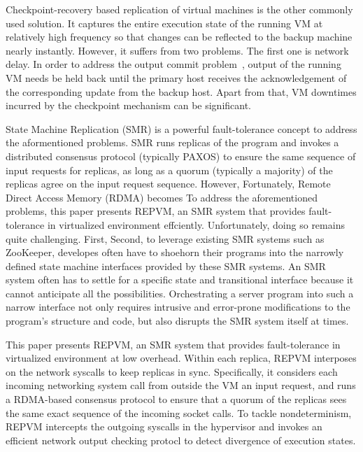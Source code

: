 Checkpoint-recovery based replication of virtual machines is the other commonly used solution. 
It captures the entire execution state of the running VM at relatively high frequency so that 
changes can be reflected to the backup machine nearly instantly. However, it suffers from two 
problems. The first one is network delay. In order to address the output commit 
problem~\cite{strom1987volatile}, output of the running VM needs be held back until the primary 
host receives the acknowledgement of the corresponding update from the backup host. Apart from 
that, VM downtimes incurred by the checkpoint mechanism can be significant.

State Machine Replication (SMR) is a powerful fault-tolerance concept to address the aformentioned 
problems. SMR runs replicas of the program and invokes a distributed consensus protocol (typically PAXOS) 
to ensure the same sequence of input requests for replicas, as long as a quorum (typically a majority) 
of the replicas agree on the input request sequence.
However, 
Fortunately, Remote Direct Access Memory (RDMA) becomes 
To address the aforementioned problems, this paper presents REPVM, an SMR system that provides 
fault-tolerance in virtualized environment effciently.
Unfortunately, doing so remains quite challenging. First, 
Second, to leverage existing SMR systems such as ZooKeeper, developes often have to shoehorn their 
programs into the narrowly defined state machine interfaces provided by these SMR systems. An SMR 
system often has to settle for a specific state and transitional interface because it cannot 
anticipate all the possibilities. Orchestrating a server program into such a narrow interface not 
only requires intrusive and error-prone modifications to the program's structure and code, but also 
disrupts the SMR system itself at times.

This paper presents REPVM, an SMR system that provides fault-tolerance in virtualized environment 
at low overhead. Within each replica, REPVM interposes on the network syscalls to keep replicas in 
sync. Specifically, it considers each incoming networking system call from outside the VM an input 
request, and runs a RDMA-based \paxos consensus protocol to ensure that a quorum of the replicas sees the same 
exact sequence of the incoming socket calls. To tackle nondeterminism, REPVM intercepts the outgoing 
syscalls in the hypervisor and invokes an efficient network output checking protocl to detect 
divergence of execution states.

